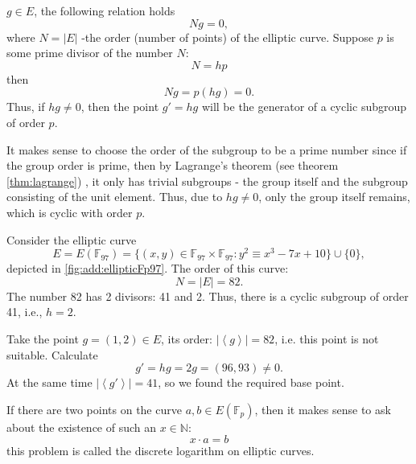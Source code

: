 $g \in E$, the following relation holds
\[
N g = 0,
\]
where $N = \left|E\right|$ -the order (number of points) of the elliptic curve.
Suppose $p$ is some prime divisor of the number $N$:
\[
N = h p
\]
then
\[
N g = p \left( h g \right) = 0.
\]
Thus, if $hg \ne 0$, then the point $g' = h g$ will be the generator
of a cyclic subgroup of order $p$.
\begin{remark}
It makes sense to choose the order of the subgroup to be a prime number since if the group order is prime, then by Lagrange’s theorem (see theorem \ref{thm:lagrange}) , it only has trivial subgroups - the group itself and the subgroup consisting of the unit element. Thus, due to $hg \ne 0$, only the group itself remains, which is cyclic with order $p$. 
\end{remark}



\begin{example}
\label{ex:add:elliptic:basepoint}
Consider the elliptic curve 
\[
E = E\left(\mathbb{F}_{97}\right) = 
\{(x,y) \in \mathbb{F}_{97} \times \mathbb{F}_{97}: y^2 \equiv x^3 -7 x + 10 \} \cup \{0\},
\] 
depicted in \autoref{fig:add:ellipticFp97}. The order of this curve:
\[
N = \left|E\right| = 82.
\]
The number 82 has 2 divisors: 41 and 2. Thus, there is a cyclic
subgroup of order 41, i.e., $h = 2$. 

Take the point $g = (1,2) \in E$, its order:
$\left|\left<g\right>\right| = 82$, i.e. this point is not suitable. 
Calculate 
\[
g' = h g = 2 g = (96,93) \ne 0.
\]
At the same time $\left|\left<g'\right>\right| = 41$, so we found the required base point.
\end{example}

If there are two points on the curve $a, b \in E\left(\mathbb{F}_p\right)$, then it makes sense to ask about the existence of such an $x \in \mathbb{N}$:
\[
x \cdot a = b
\]
this problem is called the discrete logarithm on elliptic curves. 
